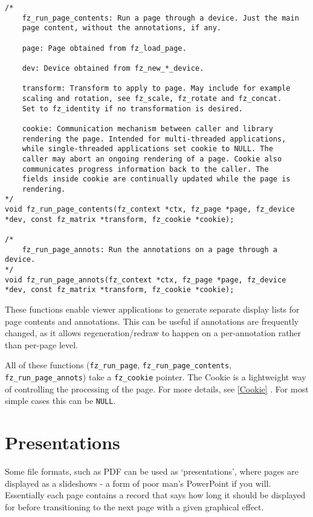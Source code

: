 \documentclass[oneside]{book}
\newcommand{\rjwref}[1] {\autoref{#1} \nameref{#1}}
\begin{document}
\begin{lstlisting}
/*
	fz_run_page_contents: Run a page through a device. Just the main
	page content, without the annotations, if any.

	page: Page obtained from fz_load_page.

	dev: Device obtained from fz_new_*_device.

	transform: Transform to apply to page. May include for example
	scaling and rotation, see fz_scale, fz_rotate and fz_concat.
	Set to fz_identity if no transformation is desired.

	cookie: Communication mechanism between caller and library
	rendering the page. Intended for multi-threaded applications,
	while single-threaded applications set cookie to NULL. The
	caller may abort an ongoing rendering of a page. Cookie also
	communicates progress information back to the caller. The
	fields inside cookie are continually updated while the page is
	rendering.
*/
void fz_run_page_contents(fz_context *ctx, fz_page *page, fz_device *dev, const fz_matrix *transform, fz_cookie *cookie);

/*
	fz_run_page_annots: Run the annotations on a page through a device.
*/
void fz_run_page_annots(fz_context *ctx, fz_page *page, fz_device *dev, const fz_matrix *transform, fz_cookie *cookie);
\end{lstlisting}

These functions enable viewer applications to generate separate display lists for page contents and annotations. This can be useful if annotations are frequently changed, as it allows regeneration/redraw to happen on a per-annotation rather than per-page level.

All of these functions (\texttt{fz\_run\_page}, \texttt{fz\_run\_page\_contents}, \texttt{fz\_run\_page\_annots}) take a \texttt{fz\_cookie} pointer. The Cookie is a lightweight way of controlling the processing of the page. For more details, see \rjwref{Cookie}. For most simple cases this can be \texttt{NULL}.

\section{Presentations}
\label{Presentations}

Some file formats, such as PDF can be used as `presentations', where pages are displayed as a slideshows - a form of poor man's PowerPoint if you will. Essentially each page contains a record that says how long it should be displayed for before transitioning to the next page with a given graphical effect.
\end{document}
